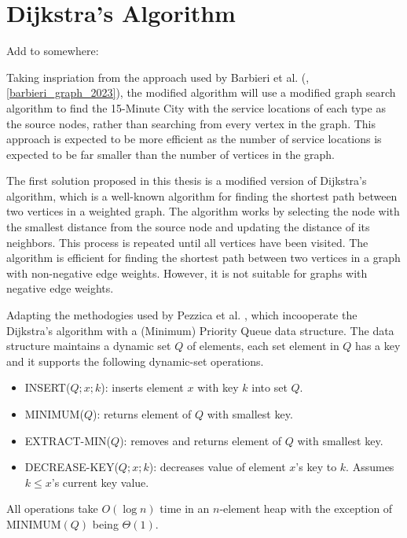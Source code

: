 \section{Dijkstra's Algorithm}

Add to somewhere:

Taking inspriation from the approach used by Barbieri et al. (\cite{barbieri_graph_2023}, \ref{barbieri_graph_2023}), the modified algorithm will use a modified graph search algorithm to find the 15-Minute City with the service locations of each type as the source nodes, rather than searching from every vertex in the graph. This approach is expected to be more efficient as the number of service locations is expected to be far smaller than the number of vertices in the graph.

\newpage

The first solution proposed in this thesis is a modified version of Dijkstra's algorithm, which is a well-known algorithm for finding the shortest path between two vertices in a weighted graph. The algorithm works by selecting the node with the smallest distance from the source node and updating the distance of its neighbors. This process is repeated until all vertices have been visited. The algorithm is efficient for finding the shortest path between two vertices in a graph with non-negative edge weights. However, it is not suitable for graphs with negative edge weights.

Adapting the methodogies used by Pezzica et al. \cite{cormen2022introduction}, which incooperate the Dijkstra's algorithm with a (Minimum) Priority Queue data structure. The data structure maintains a dynamic set $Q$ of elements, each set element in $Q$ has a key and it supports the following dynamic-set operations.

\begin{itemize}
    \item INSERT($Q; x; k$): inserts element $x$ with key $k$ into set $Q$.
    \item MINIMUM($Q$): returns element of $Q$ with smallest key.
    \item EXTRACT-MIN($Q$): removes and returns element of $Q$ with smallest key.
    \item DECREASE-KEY($Q;x;k$): decreases value of element $x$'s key to $k$. Assumes $k\leq x$'s current key value.
\end{itemize}

All operations take $O(\log n)$ time in an $n$-element heap with the exception of $\text{MINIMUM}(Q)$ being $\Theta(1)$.

